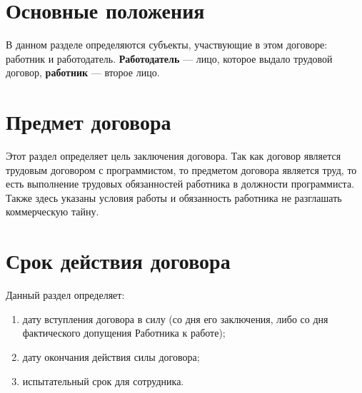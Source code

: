 \documentclass[a4paper]{article}
\begin{document}
	\thispagestyle{empty}
	
	
	
	\newpage
	
	\tableofcontents
	
	\pagestyle{plain}
	
	\newpage
	
	\section{Основные положения}
		В данном разделе определяются субъекты, участвующие в этом договоре: работник и работодатель. \textbf{Работодатель} --- лицо, которое выдало трудовой договор, \textbf{работник} --- второе лицо.
	
	\section{Предмет договора}
		Этот раздел определяет цель заключения договора. Так как договор является трудовым договором с программистом, то предметом договора является труд, то есть выполнение трудовых обязанностей работника в должности программиста. Также здесь указаны условия работы и обязанность работника не разглашать коммерческую тайну.
	
	\section{Срок действия договора}
		Данный раздел определяет:
		\begin{enumerate}
			\item дату вступления договора в силу  (со дня его заключения, либо со дня фактического допущения Работника к работе);
			
			\item дату окончания действия силы договора;
			
			\item испытательный срок для сотрудника.
		\end{enumerate}
\end{document}
